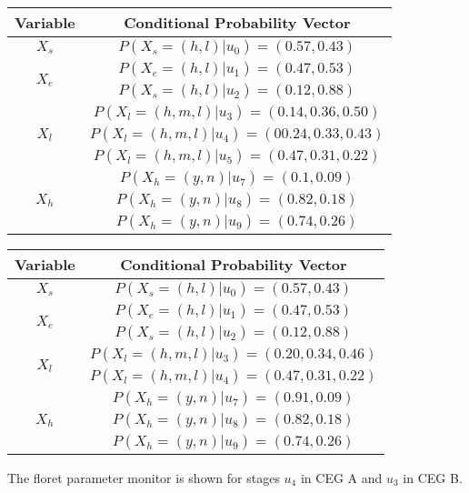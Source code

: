 \documentclass[12pt]{article}
\begin{document}
\begin{center}
\begin{tabular}{ |c|c|} 
\hline
Variable & Conditional Probability Vector  \\
\hline
\multirow{1}{4em}{$X_s$} & $P(X_s = (h, l) | u_0) = (0.57, 0.43) $ \\ 
\hline
\multirow{2}{4em}{$X_e$} & $P(X_e = (h, l) | u_1) = (0.47, 0.53)$ \\ 
& $P(X_s = (h, l) | u_2) = (0.12, 0.88)$  \\ 
\hline 
\multirow{3}{4em}{$X_l$} & $P(X_l = (h,m,l) | u_3) = (0.14, 0.36, 0.50) $ \\ 
& $P(X_l = (h,m,l) | u_4) = (00.24, 0.33, 0.43) $  \\ 
& $P(X_l = (h,m,l) | u_5) = (0.47, 0.31, 0.22) $  \\ %
\hline
\multirow{3}{4em}{$X_h$} & $P(X_h = (y,n) | u_7) = (0.1, 0.09)$ \\ 
& $P(X_h = (y,n) | u_8) = (0.82, 0.18)$  \\ 
& $P(X_h = (y,n) | u_9) = (0.74, 0.26)$  \\ 
\hline
\end{tabular}
\end{center}

\begin{center}
\begin{tabular}{ |c|c|} 
\hline
Variable & Conditional Probability Vector  \\
\hline
\multirow{1}{4em}{$X_s$} & $P(X_s = (h, l) | u_0) = (0.57, 0.43) $ \\ 
\hline
\multirow{2}{4em}{$X_e$} & $P(X_e = (h, l) | u_1) = (0.47, 0.53)$ \\ 
& $P(X_s = (h, l) | u_2) = (0.12, 0.88)$  \\ 
\hline 
\multirow{2}{4em}{$X_l$} & $P(X_l = (h,m,l) | u_3) = (0.20, 0.34, 0.46) $ \\ 
& $P(X_l = (h,m,l) | u_4) = (0.47, 0.31, 0.22) $  \\ 
\hline
\multirow{3}{4em}{$X_h$} & $P(X_h = (y,n) | u_7) = (0.91, 0.09)$ \\ 
& $P(X_h = (y,n) | u_8) = (0.82, 0.18)$  \\ 
& $P(X_h = (y,n) | u_9) = (0.74, 0.26)$  \\ 
\hline
\end{tabular}
\end{center}

The floret parameter monitor is shown for stages $u_4$ in CEG A and $u_3$ in CEG B.
\end{document}
